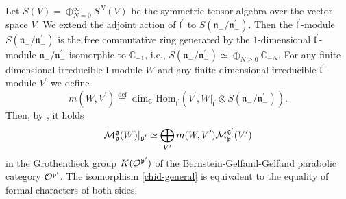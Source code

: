 \documentclass[a4paper,12pt,reqno]{amsart}
\numberwithin{theorem}{subsection}
\numberwithin{equation}{section}
\begin{document}
Let $S(V) = \oplus_{N =0}^\infty S^N(V)$ be the symmetric tensor algebra over
the vector space $V$. We extend the adjoint action of ${{\mathfrak l}}^\prime$ to
$S({{\mathfrak n}}_-/{{\mathfrak n}}^\prime_-)$. Then the ${{\mathfrak l}}^\prime$-module
$S({{\mathfrak n}}_-/{{\mathfrak n}}^\prime_-)$ is the free commutative ring generated by the
$1$-dimensional ${{\mathfrak l}}^\prime$-module ${{\mathfrak n}}_-/{{\mathfrak n}}_-^\prime$ isomorphic to
${\mathbb{C}}_{-1}$, i.e., $S({{\mathfrak n}}_-/{{\mathfrak n}}^\prime_-) \simeq \oplus_{N \ge 0} {\mathbb{C}}_{-N}$. For
any finite dimensional irreducible ${{\mathfrak l}}$-module $W$ and any finite dimensional
irreducible ${{\mathfrak l}}^\prime$-module $V^\prime$ we define
\begin{equation}\label{multiplicity-gen}
   m(W,V^\prime) {\stackrel{\text{def}}{=}} {\operatorname{dim}}_{\mathbb{C}} \mathrm{Hom}_{{{\mathfrak l}}^\prime}
   \left(V^\prime,W|_{{{\mathfrak l}}^\prime} \otimes S({{\mathfrak n}}_-/{{\mathfrak n}}^\prime_-)\right).
\end{equation}
Then, by \cite[Theorem $3.10$]{ko}, it holds
\begin{equation}\label{chid-general}
   {\fam2 M}^{{\mathfrak g}}_{{\mathfrak p}} (W) |_{{{\mathfrak g}}^\prime} \simeq \bigoplus_{V^\prime} m(W,V^\prime)
   {\fam2M}^{{{\mathfrak g}}^\prime}_{{{\mathfrak p}}^\prime} (V^\prime)
\end{equation}
in the Grothendieck group $K({\fam2 O}^{{{\mathfrak p}}^\prime})$ of the
Bernstein-Gelfand-Gelfand parabolic category ${\fam2 O}^{{{\mathfrak p}}^\prime}$. The
isomorphism \eqref{chid-general} is equivalent to the equality of formal
characters of both sides.
\end{document}
